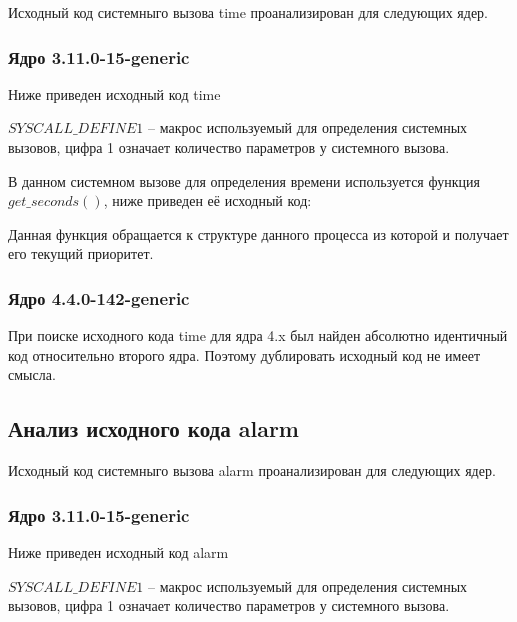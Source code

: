 \par Исходный код системныго вызова time проанализирован для следующих ядер.

\subsubsection{Ядро 3.11.0-15-generic}

\par Ниже приведен исходный код time


\par $SYSCALL\_DEFINE1$ -- макрос используемый для определения системных вызовов, цифра 1 означает количество параметров у системного вызова.

\par В данном системном вызове для определения времени используется функция $get\_seconds()$, ниже приведен её исходный код:



\par Данная функция обращается к структуре данного процесса из которой и получает его текущий приоритет.

\subsubsection{Ядро 4.4.0-142-generic}

\par При поиске исходного кода time для ядра 4.x был найден абсолютно идентичный код относительно второго ядра. Поэтому дублировать исходный код не имеет смысла.


\subsection{Анализ исходного кода alarm} %

\par Исходный код системныго вызова alarm проанализирован для следующих ядер.

\subsubsection{Ядро 3.11.0-15-generic}

\par Ниже приведен исходный код alarm


\par $SYSCALL\_DEFINE1$ -- макрос используемый для определения системных вызовов, цифра 1 означает количество параметров у системного вызова. 

